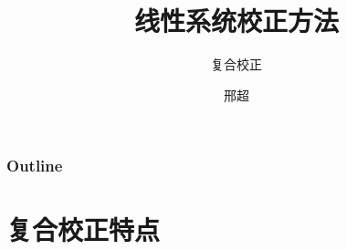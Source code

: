 \documentclass[table]{beamer}
\subtitle{复合校正}
\title{线性系统校正方法}
\author{邢超}
\date{}
\begin{document}
\maketitle

\begin{frame}
\frametitle{Outline}
\setcounter{tocdepth}{3}
\tableofcontents
\end{frame}













\section{复合校正特点}
\label{sec-1}
\end{document}
